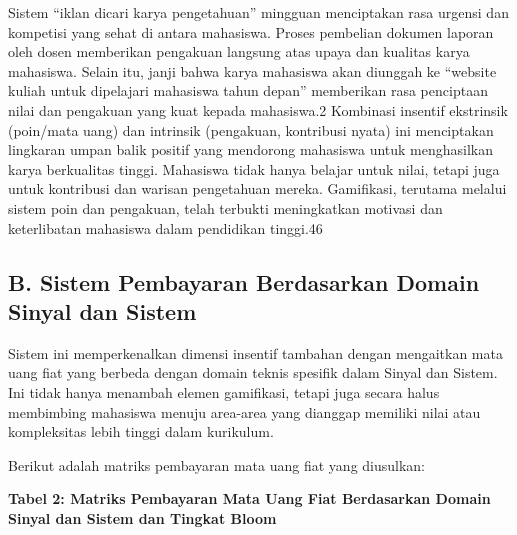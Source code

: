 \documentclass[
  letterpaper,
  DIV=11,
  numbers=noendperiod]{scrreprt}
\begin{document}
Sistem ``iklan dicari karya pengetahuan'' mingguan menciptakan rasa
urgensi dan kompetisi yang sehat di antara mahasiswa. Proses pembelian
dokumen laporan oleh dosen memberikan pengakuan langsung atas upaya dan
kualitas karya mahasiswa. Selain itu, janji bahwa karya mahasiswa akan
diunggah ke ``website kuliah untuk dipelajari mahasiswa tahun depan''
memberikan rasa penciptaan nilai dan pengakuan yang kuat kepada
mahasiswa.2 Kombinasi insentif ekstrinsik (poin/mata uang) dan intrinsik
(pengakuan, kontribusi nyata) ini menciptakan lingkaran umpan balik
positif yang mendorong mahasiswa untuk menghasilkan karya berkualitas
tinggi. Mahasiswa tidak hanya belajar untuk nilai, tetapi juga untuk
kontribusi dan warisan pengetahuan mereka. Gamifikasi, terutama melalui
sistem poin dan pengakuan, telah terbukti meningkatkan motivasi dan
keterlibatan mahasiswa dalam pendidikan tinggi.46

\subsection{B. Sistem Pembayaran Berdasarkan Domain Sinyal dan
Sistem}\label{b.-sistem-pembayaran-berdasarkan-domain-sinyal-dan-sistem}

Sistem ini memperkenalkan dimensi insentif tambahan dengan mengaitkan
mata uang fiat yang berbeda dengan domain teknis spesifik dalam Sinyal
dan Sistem. Ini tidak hanya menambah elemen gamifikasi, tetapi juga
secara halus membimbing mahasiswa menuju area-area yang dianggap
memiliki nilai atau kompleksitas lebih tinggi dalam kurikulum.

Berikut adalah matriks pembayaran mata uang fiat yang diusulkan:

\textbf{Tabel 2: Matriks Pembayaran Mata Uang Fiat Berdasarkan Domain
Sinyal dan Sistem dan Tingkat Bloom}
\end{document}
